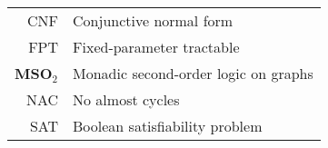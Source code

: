 \documentclass[english,bachelor,bw,unicode,oneside]{ctufit-thesis}
\newcommand{\MSO}{\textbf{MSO}$_2$}
\begin{document}
\printabstractpage{} %

% 
% 
% 
% 
% 
% 
% 
% 
% 

\tableofcontents %
\listoffigures %
\begingroup
\let\clearpage\relax
\listoftables %
\thectufitlistingscommand{}
\endgroup

\chapter{\thectufitabbreviationlabel}

\begin{tabular}{rl}
	CNF    & Conjunctive normal form              \\
	FPT    & Fixed-parameter tractable            \\
	\MSO{} & Monadic second-order logic on graphs \\
	NAC    & No almost cycles                     \\
	SAT    & Boolean satisfiability problem       \\
\end{tabular}
\resumeTOCentries{}
\mainmatter\mainmatterinit{} %
\end{document}
